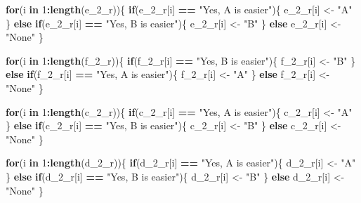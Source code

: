 \documentclass[
]{article}
\newenvironment{Shaded}{\begin{snugshade}}{\end{snugshade}}
\newcommand{\ControlFlowTok}[1]{\textcolor[rgb]{0.13,0.29,0.53}{\textbf{#1}}}
\newcommand{\DecValTok}[1]{\textcolor[rgb]{0.00,0.00,0.81}{#1}}
\newcommand{\KeywordTok}[1]{\textcolor[rgb]{0.13,0.29,0.53}{\textbf{#1}}}
\newcommand{\NormalTok}[1]{#1}
\newcommand{\OperatorTok}[1]{\textcolor[rgb]{0.81,0.36,0.00}{\textbf{#1}}}
\newcommand{\StringTok}[1]{\textcolor[rgb]{0.31,0.60,0.02}{#1}}
\begin{document}
\begin{Shaded}
\begin{Highlighting}[]
\ControlFlowTok{for}\NormalTok{(i }\ControlFlowTok{in} \DecValTok{1}\OperatorTok{:}\KeywordTok{length}\NormalTok{(e_}\DecValTok{2}\NormalTok{_r))\{}
  \ControlFlowTok{if}\NormalTok{(e_}\DecValTok{2}\NormalTok{_r[i] }\OperatorTok{==}\StringTok{ "Yes, A is easier"}\NormalTok{)\{}
\NormalTok{    e_}\DecValTok{2}\NormalTok{_r[i] <-}\StringTok{ "A"}
\NormalTok{  \} }\ControlFlowTok{else} \ControlFlowTok{if}\NormalTok{(e_}\DecValTok{2}\NormalTok{_r[i] }\OperatorTok{==}\StringTok{ "Yes, B is easier"}\NormalTok{)\{}
\NormalTok{    e_}\DecValTok{2}\NormalTok{_r[i] <-}\StringTok{ "B"}
\NormalTok{  \} }\ControlFlowTok{else}\NormalTok{ e_}\DecValTok{2}\NormalTok{_r[i] <-}\StringTok{ "None"}
\NormalTok{\}}

\ControlFlowTok{for}\NormalTok{(i }\ControlFlowTok{in} \DecValTok{1}\OperatorTok{:}\KeywordTok{length}\NormalTok{(f_}\DecValTok{2}\NormalTok{_r))\{}
  \ControlFlowTok{if}\NormalTok{(f_}\DecValTok{2}\NormalTok{_r[i] }\OperatorTok{==}\StringTok{ "Yes, B is easier"}\NormalTok{)\{}
\NormalTok{    f_}\DecValTok{2}\NormalTok{_r[i] <-}\StringTok{ "B"}
\NormalTok{  \} }\ControlFlowTok{else} \ControlFlowTok{if}\NormalTok{(f_}\DecValTok{2}\NormalTok{_r[i] }\OperatorTok{==}\StringTok{ "Yes, A is easier"}\NormalTok{)\{}
\NormalTok{    f_}\DecValTok{2}\NormalTok{_r[i] <-}\StringTok{ "A"}
\NormalTok{  \} }\ControlFlowTok{else}\NormalTok{ f_}\DecValTok{2}\NormalTok{_r[i] <-}\StringTok{ "None"}
\NormalTok{\}}

\ControlFlowTok{for}\NormalTok{(i }\ControlFlowTok{in} \DecValTok{1}\OperatorTok{:}\KeywordTok{length}\NormalTok{(c_}\DecValTok{2}\NormalTok{_r))\{}
  \ControlFlowTok{if}\NormalTok{(c_}\DecValTok{2}\NormalTok{_r[i] }\OperatorTok{==}\StringTok{ "Yes, A is easier"}\NormalTok{)\{}
\NormalTok{    c_}\DecValTok{2}\NormalTok{_r[i] <-}\StringTok{ "A"}
\NormalTok{  \} }\ControlFlowTok{else} \ControlFlowTok{if}\NormalTok{(c_}\DecValTok{2}\NormalTok{_r[i] }\OperatorTok{==}\StringTok{ "Yes, B is easier"}\NormalTok{)\{ }
\NormalTok{    c_}\DecValTok{2}\NormalTok{_r[i] <-}\StringTok{ "B"}
\NormalTok{  \} }\ControlFlowTok{else}\NormalTok{ c_}\DecValTok{2}\NormalTok{_r[i] <-}\StringTok{ "None"}
\NormalTok{\}}

\ControlFlowTok{for}\NormalTok{(i }\ControlFlowTok{in} \DecValTok{1}\OperatorTok{:}\KeywordTok{length}\NormalTok{(d_}\DecValTok{2}\NormalTok{_r))\{}
  \ControlFlowTok{if}\NormalTok{(d_}\DecValTok{2}\NormalTok{_r[i] }\OperatorTok{==}\StringTok{ "Yes, A is easier"}\NormalTok{)\{}
\NormalTok{    d_}\DecValTok{2}\NormalTok{_r[i] <-}\StringTok{ "A"}
\NormalTok{  \} }\ControlFlowTok{else} \ControlFlowTok{if}\NormalTok{(d_}\DecValTok{2}\NormalTok{_r[i] }\OperatorTok{==}\StringTok{ "Yes, B is easier"}\NormalTok{)\{ }
\NormalTok{    d_}\DecValTok{2}\NormalTok{_r[i] <-}\StringTok{ "B"}
\NormalTok{  \} }\ControlFlowTok{else}\NormalTok{ d_}\DecValTok{2}\NormalTok{_r[i] <-}\StringTok{ "None"}
\NormalTok{\}}



\end{Highlighting}
\end{Shaded}
\end{document}
